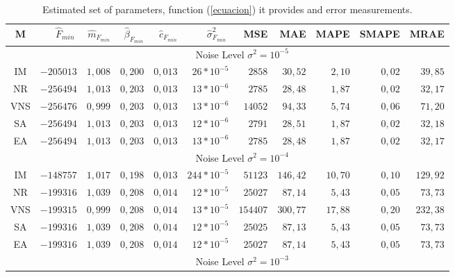 \documentclass{sig-alternate}
\begin{document}
{\scriptsize
\begin{table}
\caption{\footnotesize{Estimated set of parameters, function (\ref{ecuacion}) it provides and error measurements.}}
\begin{center}
{\scriptsize
\begin{tabular}{c|rrrrr|rrrrr}
\hline
   M & $\hat{F}_{min}\ $ &  $\hat{m}_{F_{min}}$ &  $\hat{\beta}_{F_{min}}$ &  $\hat{c}_{F_{min}}$ & $\hat{\sigma}^{2}_{F_{min}}\ $&  MSE\hspace{0.2cm} &  MAE &  MAPE &  SMAPE & MRAE  \\

\hline
\hline
&\multicolumn{10}{c}{ Noise Level $ \sigma^2= 10^{-5}$} \\
\hline

	 		IM & $-205013$		&$1,008$	&$0,200$	&$0,013$	&$26*10^{-5}$	& $2858$	&$30,52$ 	&$2,10$	&$0,02$	&$39,85$	\\
	 		NR & $-256494$		&$1,013$	&$0,203$	&$0,013$ 	&$13*10^{-6}$ & $2785$	&$28,48$	&$1,87$	&$0,02$	&$32,17$	\\
            VNS & $-256476$		&$0,999$	&$0,203$	&$0,013$    &$13*10^{-6}$	& $14052$	&$94,33$ 	&$5,74$	&$0,06$	&$71,20$	\\
 			SA & $-256494$    	&$1,013$	&$0,203$	&$0,013$   	&$12*10^{-6}$	&$2791$		&$28,51$  &$1,87$	&$0,02$ &$32,18$	\\
 			EA& $-256494$   	&$1,013$	&$0,203$	&$0,013$	&$13*10^{-6}$ 	&$2785$		&$	28,48$	&$1,87$	&$0,02$	&$32,17$ 	\\
 \hline
\hline
&\multicolumn{10}{c}{Noise Level $ \sigma^2= 10^{-4}$} \\
\hline
	 	    IM & $-148757$		&$1,017$	&$0,198$	&$0,013$	&$244*10^{-5}$	&$51123$ 	&$146,42$ 	&$10,70$ 	&$0,10$	&$129,92$	\\
	 	    NR& $-199316$		&$1,039$	&$0,208$	&$0,014$	&$12*10^{-5}$ &$25027$	&$87,14$	&$5,43$		&$0,05$	&$73,73$ 	\\
            VNS& $-199315$		&$0,999$	&$0,208$	&$0,014$	&$13*10^{-5}$	&$154407$ 	&$300,77$ 	&$17,88$ 	&$0,20$	&$232,38$	\\
 			SA& $-199316$		&$1,039$	&$0,208$	&$0,014$	&$12*10^{-5}$ 	&$25025	$	&$87,13	$	&$5,43$		&$0,05$	&$73,73$	\\
 			EA & $-199316$		&$1,039$	&$0,208$	&$0,014$	&$12*10^{-5}$	&$25027$	&$87,14$	&$5,43$		&$0,05$	&$73,73$	\\
\hline
\hline
&\multicolumn{10}{c}{Noise Level $ \sigma^2= 10^{-3}$} \\

\end{tabular}}
\end{center}
\end{table}}
\end{document}
